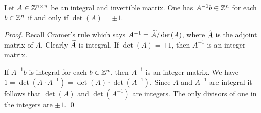 




\begin{lemma}
  \label{po:lem:6}
  Let $A\in \mathbb{Z}^{n\times n}$ be an integral and invertible matrix. One has
  $A^{-1}b \in \mathbb{Z}^n$ for each $b \in \mathbb{Z}^n$ if and only if $\det(A)=\pm 1$.
\end{lemma}


\begin{proof}
  Recall Cramer's rule which says $A^{-1} = \widetilde{A}/\det(A) $, where
  $\widetilde{A}$ is the adjoint matrix of $A$. Clearly $\widetilde{A}$ is
  integral. If $\det(A) = \pm 1$, then $A^{-1}$ is an integer matrix. 

  If $A^{-1}b$ is integral for each $b \in \mathbb{Z}^n$, then $A^{-1}$ is an
  integer matrix. We have $1=\det(A\cdot A^{-1})=\det(A)\cdot\det(A^{-1})$.
  Since $A$ and $A^{-1}$ are integral it follows that $\det(A)$ and
  $\det(A^{-1})$ are integers. The only divisors of one in the integers
  are $\pm 1$.  \qed 
\end{proof}




